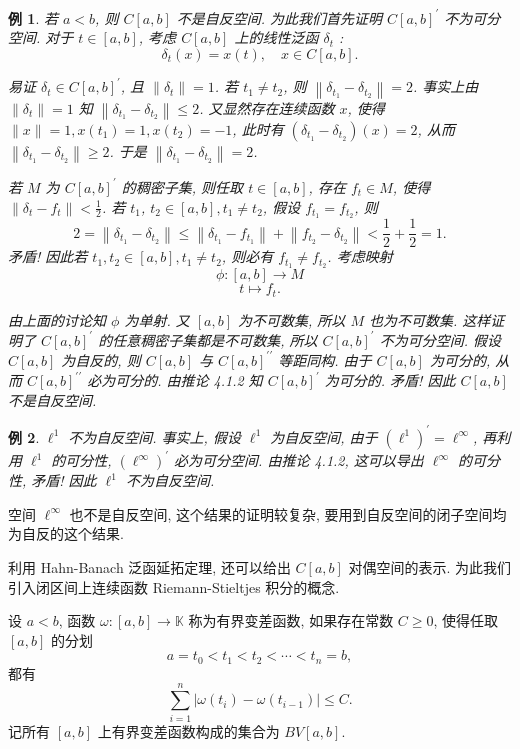\documentclass[openany]{ctexbook}
\theoremstyle{kaiti}
\theoremstyle{normal}
\newtheorem{example}{例}[section]
\begin{document}
\begin{example}
若 $a<b$, 则 $C[a, b]$ 不是自反空间. 为此我们首先证明 $C[a, b]^{\prime}$ 不为可分空间. 对于 $t \in[a, b]$, 考虑 $C[a, b]$ 上的线性泛函 $\delta_{t}$ :
$$
\delta_{t}(x)=x(t), \quad x \in C[a, b].
$$

易证 $\delta_{t} \in C[a, b]^{\prime}$, 且 $\left\|\delta_{t}\right\|=1$. 若 $t_1 \neq t_2$, 则 $\left\|\delta_{t_1}-\delta_{t_2}\right\|=2$. 事实上由 $\left\|\delta_{t}\right\|=1$ 知 $\left\|\delta_{t_1}-\delta_{t_2}\right\| \leqslant 2$. 又显然存在连续函数 $x$, 使得 $\|x\|=1, x\left(t_1\right)=1, x\left(t_2\right)=-1$, 此时有 $\left(\delta_{t_1}-\delta_{t_2}\right)(x)=2$, 从而 $\left\|\delta_{t_1}-\delta_{t_2}\right\| \geqslant 2$. 于是 $\left\|\delta_{t_1}-\delta_{t_2}\right\|=2$.

若 $M$ 为 $C[a, b]^{\prime}$ 的稠密子集, 则任取 $t \in[a, b]$, 存在 $f_{t} \in M$, 使得 $\left\|\delta_{t}-f_{t}\right\|<\frac{1}{2}$. 若 $t_1$, $t_2 \in[a, b], t_1 \neq t_2$, 假设 $f_{t_1}=f_{t_2}$, 则
$$
2=\left\|\delta_{t_1}-\delta_{t_2}\right\| \leqslant\left\|\delta_{t_1}-f_{t_1}\right\|+\left\|f_{t_2}-\delta_{t_2}\right\|<\frac{1}{2}+\frac{1}{2}=1.
$$
矛盾! 因此若 $t_1, t_2 \in[a, b], t_1 \neq t_2$, 则必有 $f_{t_1} \neq f_{t_2}$. 考虑映射
$$
\phi:[a, b] \rightarrow M
$$
$$
t \mapsto f_{t}.
$$

由上面的讨论知 $\phi$ 为单射. 又 $[a, b]$ 为不可数集, 所以 $M$ 也为不可数集. 这样证明了 $C[a, b]^{\prime}$ 的任意稠密子集都是不可数集, 所以 $C[a, b]^{\prime}$ 不为可分空间.
假设 $C[a, b]$ 为自反的, 则 $C[a, b]$ 与 $C[a, b]^{\prime \prime}$ 等距同构. 由于 $C[a, b]$ 为可分的, 从而 $C[a, b]^{\prime \prime}$ 必为可分的. 由推论 4.1.2 知 $C[a, b]^{\prime}$ 为可分的. 矛盾! 因此 $C[a, b]$ 不是自反空间.
\end{example}

\begin{example}
$\ell^1$ 不为自反空间. 事实上, 假设 $\ell^1$ 为自反空间, 由于 $\left(\ell^1\right)^{\prime}=\ell^{\infty}$, 再利用 $\ell^1$ 的可分性, $\left(\ell^{\infty}\right)^{\prime}$ 必为可分空间. 由推论 4.1.2, 这可以导出 $\ell^{\infty}$ 的可分性, 矛盾! 因此 $\ell^1$ 不为自反空间.
\end{example}

空间 $\ell^{\infty}$ 也不是自反空间, 这个结果的证明较复杂, 要用到自反空间的闭子空间均为自反的这个结果.

利用 Hahn-Banach 泛函延拓定理, 还可以给出 $C[a, b]$ 对偶空间的表示. 为此我们引入闭区间上连续函数 Riemann-Stieltjes 积分的概念.

设 $a<b$, 函数 $\omega:[a, b] \rightarrow \mathbb{K}$ 称为有界变差函数, 如果存在常数 $C \geqslant 0$, 使得任取 $[a, b]$ 的分划
$$
a=t_0<t_1<t_2<\cdots<t_n=b,
$$
都有
$$
\sum_{i=1}^n\left|\omega\left(t_{i}\right)-\omega\left(t_{i-1}\right)\right| \leqslant C.
$$
记所有 $[a, b]$ 上有界变差函数构成的集合为 $B V[a, b]$.
\end{document}
